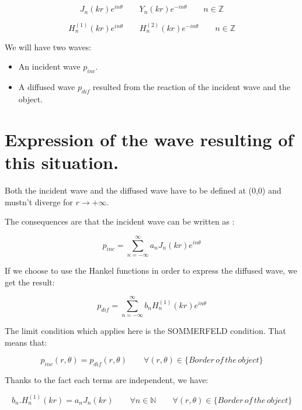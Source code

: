\begin{equation}
J_{n}(kr)e^{in\theta} \qquad Y_{n}(kr)e^{-in\theta}  \qquad    n\in \mathbb{Z}
\end{equation}

\begin{equation}
H^{(1)}_{n}(kr)e^{in\theta} \qquad H^{(2)}_{n}(kr)e^{-in\theta}  \qquad    n\in \mathbb{Z}
\end{equation}

We will have two waves:
\begin{itemize}
\item An incident wave $p_{inc}$.
\item A diffused wave $p_{dif}$ resulted from the reaction of the incident wave and the object.
\end{itemize}

\chapter{Expression of the wave resulting of this situation.}

Both the incident wave and the diffused wave have to be defined at (0,0) and mustn't diverge for $r\rightarrow +\infty$.

The consequences are that the incident wave can be written as :

\begin{equation}
p_{inc} =  	\sum_{n=-\infty}^{\infty} a_n J_{n}(kr)e^{in\theta} 
\end{equation}

If we choose to use the Hankel functions in order to express the diffused wave, we get the result:

\begin{equation}
p_{dif} =  	\sum_{n=-\infty}^{\infty} b_{n}H^{(1)}_{n}(kr)e^{in\theta}
\end{equation}

The limit condition which applies here is the SOMMERFELD condition. That means that:

\begin{equation}
p_{inc}(r,\theta) = p_{dif}(r,\theta) \qquad \forall(r,\theta) \in \{Border\, of\, the\, object\}
\end{equation}

Thanks to the fact each terms are independent, we have:

\begin{equation}
b_{n}.H^{(1)}_{n}(kr) = a_n J_{n}(kr) \qquad \forall n \in \mathbb{N} \qquad \forall(r,\theta) \in \{Border\, of\, the\, object\}
\end{equation}

